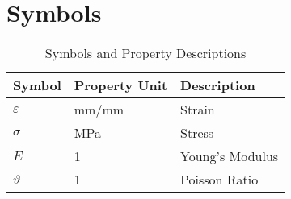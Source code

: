 \section*{Symbols}

\begin{table}[h]
\centering
\caption{Symbols and Property Descriptions}
\begin{tabular}{@{}lll@{}}
\toprule
\textbf{Symbol} & \textbf{Property Unit} & \textbf{Description} \\
\midrule
$\varepsilon$ & mm/mm & Strain \\
$\sigma$ & MPa & Stress \\
$E$ & 1 & Young's Modulus \\
$\vartheta$ & 1 & Poisson Ratio \\
\bottomrule
\end{tabular}
\end{table}